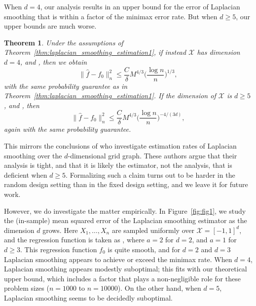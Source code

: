 \documentclass[twoside]{article}
\newcommand{\1}{\mathbf{1}}
\newcommand{\Xset}{\mathcal{X}}
\newcommand{\wh}[1]{\widehat{#1}}
\newtheorem{theorem}{Theorem}
\theoremstyle{definition}
\theoremstyle{remark}
\begin{document}
When $d = 4$, our analysis results in an upper bound for the error of Laplacian smoothing that is within a  factor of the minimax error rate. But when $d \geq 5$, our upper bounds are much worse.
\begin{theorem}
	\label{thm:laplacian_smoothing_estimation2}
  Under the assumptions of Theorem~\ref{thm:laplacian_smoothing_estimation1}, if instead $\Xset$ has dimension $d = 4$,  and , then we obtain 
	\begin{equation*}
	\bigl\|\wh{f} - f_0\bigr\|_n^2 \leq \frac{C}{\delta} M^{4/3} \biggl(\frac{\log n}{n}\biggr)^{1/3},
	\end{equation*}
with the same probability guarantee as in Theorem~\ref{thm:laplacian_smoothing_estimation1}. If the dimension of $\Xset$ is $d \geq 5$,  and , then
	\begin{equation*}
	\bigl\|\wh{f} - f_0\bigr\|_n^2 \leq \frac{C}{\delta} M^{4/3} \biggl(\frac{\log n}{n}\biggr)^{-4/(3d)},
	\end{equation*}
again with the same probability guarantee.
\end{theorem}
This mirrors the conclusions of \citet{sadhanala16} who investigate estimation rates of Laplacian smoothing over the $d$-dimensional grid graph. These authors argue that their analysis is tight, and that it is likely the estimator, not the analysis, that is deficient when $d \geq 5$. Formalizing such a claim turns out to be harder in the random design setting than in the fixed design setting, and we leave it for future work. 

However, we do investigate the matter empirically. In Figure~\ref{fig:fig1}, we study the (in-sample) mean squared error of the Laplacian smoothing estimator as the dimension $d$ grows. Here $X_1,\ldots,X_n$ are sampled uniformly over $\Xset = [-1,1]^d$, and the regression function is taken as , where $a = 2$ for $d = 2$, and $a = 1$ for $d \geq 3$. This regression function $f_0$ is quite smooth, and for $d = 2$ and $d = 3$ Laplacian smoothing appears to achieve or exceed the minimax rate. When $d = 4$, Laplacian smoothing appears modestly suboptimal; this fits with our theoretical upper bound, which includes a  factor that plays a non-negligible role for these problem sizes ($n=1000$ to $n=10000$). On the other hand, when $d = 5$, Laplacian smoothing seems to be decidedly suboptimal. 
\end{document}
